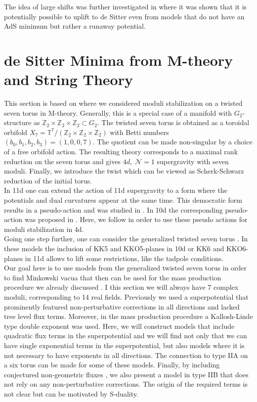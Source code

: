 \documentclass[12pt]{report}
\begin{document}
The idea of large shifts was further investigated in \cite{Linde:2020mdk} where it was shown that it is potentially possible to uplift to de Sitter even from models that do not have an AdS minimum but rather a runaway potential. 

\section{de Sitter Minima from M-theory and String Theory}
\label{sec:mtheory}
This section is based on \cite{Cribiori:2019hrb} where we considered moduli stabilization on a twisted seven torus in M-theory. Generally, this is a special case of a manifold with $G_2$-structure as $\mathbb{Z}_2 \times \mathbb{Z}_2 \times \mathbb{Z}_2 \subset G_2$. The twisted seven torus is obtained as a toroidal orbifold $X_7 = \mathbb{T}^7/(\mathbb{Z}_2 \times \mathbb{Z}_2 \times \mathbb{Z}_2)$ \cite{DallAgata:2005zlf,Duff:2010vy,Derendinger:2014wwa,Ferrara:2016fwe} with Betti numbers $(b_0,b_1,b_2,b_3) = (1,0,0,7)$. The quotient can be made non-singular by a choice of a free orbifold action. The resulting theory corresponds to a maximal rank reduction on the seven torus and gives $4d, \; \mathcal{N}=1$ supergravity with seven moduli. Finally, we introduce the twist which can be viewed as Scherk-Schwarz reduction of the initial torus.\\
In 11d one can extend the action of 11d supergravity to a form where the potentials and dual curvatures appear at the same time. This democratic form results in a pseudo-action and was studied in \cite{DallAgata:2005zlf}. In 10d the corresponding pseudo-action was proposed in \cite{Bergshoeff:2001pv}. Here, we follow \cite{DallAgata:2005zlf,Derendinger:2014wwa} in order to use these pseudo actions for moduli stabilization in 4d.\\
Going one step further, one can consider the generalized twisted seven torus \cite{Derendinger:2014wwa,Blaback:2018hdo,Villadoro:2007yq}. In these models the inclusion of KK5 and KKO5-planes in 10d or KK6 and KKO6-planes in 11d allows to lift some restrictions, like the tadpole conditions.\\
Our goal here is to use models from the generalized twisted seven torus in order to find Minkowski vacua that then can be used for the mass production procedure we already discussed \cite{Kallosh:2019zgd,Cribiori:2019drf}. I this section we will always have 7 complex moduli, corresponding to 14 real fields. Previously we used a superpotential that prominently featured non-perturbative corrections in all directions and lacked tree level flux terms. Moreover, in the mass production procedure a Kallosh-Linde type double exponent was used. Here, we will construct models that include quadratic flux terms in the superpotential and we will find not only that we can have single exponential terms in the superpotential, but also models where it is not necessary to have exponents in all directions. The connection to type IIA on a six torus can be made for some of these models. Finally, by including conjectured non-geometric fluxes \cite{Aldazabal:2006up}, we also present a model in type IIB that does not rely on any non-perturbative corrections. The origin of the required terms is not clear but can be motivated by S-duality.
\end{document}
